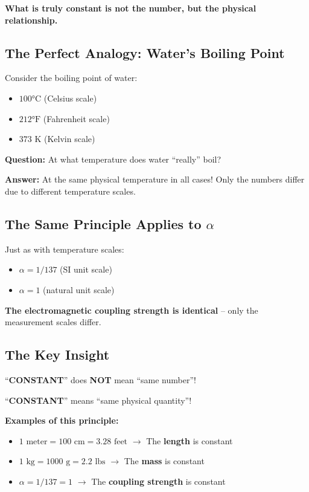 \textbf{What is truly constant is not the number, but the physical relationship.}

\subsection{The Perfect Analogy: Water's Boiling Point}

Consider the boiling point of water:
\begin{itemize}
	\item $100°\text{C}$ (Celsius scale)
	\item $212°\text{F}$ (Fahrenheit scale)
	\item $373\text{ K}$ (Kelvin scale)
\end{itemize}

\textbf{Question:} At what temperature does water ``really'' boil?

\textbf{Answer:} At the same physical temperature in all cases! Only the numbers differ due to different temperature scales.

\subsection{The Same Principle Applies to $\alpha$}

Just as with temperature scales:
\begin{itemize}
	\item $\alpha = 1/137$ (SI unit scale)
	\item $\alpha = 1$ (natural unit scale)
\end{itemize}

\textbf{The electromagnetic coupling strength is identical} -- only the measurement scales differ.

\subsection{The Key Insight}

\begin{tcolorbox}[colback=yellow!5!white,colframe=orange!75!black,title=Fundamental Principle]
	``\textbf{CONSTANT}'' does \textbf{NOT} mean ``same number''!
	
	``\textbf{CONSTANT}'' means ``same physical quantity''!
\end{tcolorbox}

\textbf{Examples of this principle:}
\begin{itemize}
	\item $1\text{ meter} = 100\text{ cm} = 3.28\text{ feet}$ $\rightarrow$ The \textbf{length} is constant
	\item $1\text{ kg} = 1000\text{ g} = 2.2\text{ lbs}$ $\rightarrow$ The \textbf{mass} is constant
	\item $\alpha = 1/137 = 1$ $\rightarrow$ The \textbf{coupling strength} is constant
\end{itemize}

